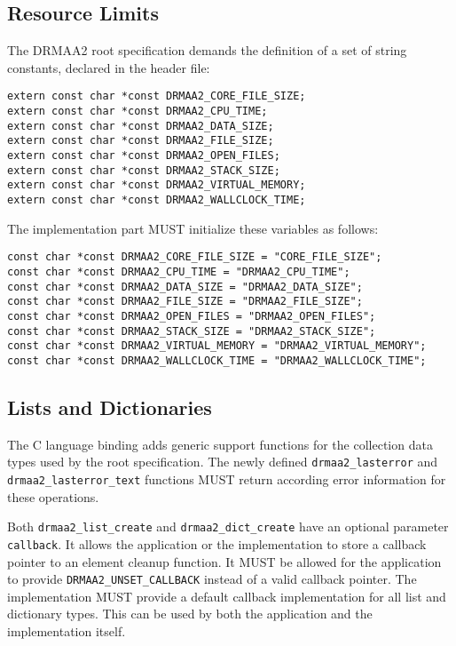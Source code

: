 \documentclass{article}
\newcommand{\h}[1]{\texttt{#1}}
\newcommand{\rat}[1]{}
\begin{document}
\subsection{Resource Limits}
\label{sec:resourcelimittype}

The DRMAA2 root specification demands the definition of a set of string constants, declared in the header file:

\begin{verbatim}
extern const char *const DRMAA2_CORE_FILE_SIZE;
extern const char *const DRMAA2_CPU_TIME;
extern const char *const DRMAA2_DATA_SIZE;
extern const char *const DRMAA2_FILE_SIZE;
extern const char *const DRMAA2_OPEN_FILES;
extern const char *const DRMAA2_STACK_SIZE;
extern const char *const DRMAA2_VIRTUAL_MEMORY;
extern const char *const DRMAA2_WALLCLOCK_TIME;
\end{verbatim}

The implementation part MUST initialize these variables as follows:

\begin{verbatim}
const char *const DRMAA2_CORE_FILE_SIZE = "CORE_FILE_SIZE";
const char *const DRMAA2_CPU_TIME = "DRMAA2_CPU_TIME";
const char *const DRMAA2_DATA_SIZE = "DRMAA2_DATA_SIZE";
const char *const DRMAA2_FILE_SIZE = "DRMAA2_FILE_SIZE";
const char *const DRMAA2_OPEN_FILES = "DRMAA2_OPEN_FILES";
const char *const DRMAA2_STACK_SIZE = "DRMAA2_STACK_SIZE";
const char *const DRMAA2_VIRTUAL_MEMORY = "DRMAA2_VIRTUAL_MEMORY";
const char *const DRMAA2_WALLCLOCK_TIME = "DRMAA2_WALLCLOCK_TIME";
\end{verbatim}

\subsection{Lists and Dictionaries}

The C language binding adds generic support functions for the collection data types used by the root specification. The newly defined \h{drmaa2\_lasterror} and \h{drmaa2\_lasterror\_text} functions MUST return according error information for these operations.

\rat{The definition of list operations in the language binding keeps the application code portable. The original DRMAA error codes are good enough to support them, there is no need for additional ones. DRMAA dictionaries are only used for strings, so we make the dictionary interface less general.}

Both \h{drmaa2\_list\_create} and \h{drmaa2\_dict\_create} have an optional parameter \h{callback}. It allows the application or the implementation to store a callback pointer to an element cleanup function. It MUST be allowed for the application to provide \h{DRMAA2\_UNSET\_CALLBACK} instead of a valid callback pointer. The implementation MUST provide a default callback implementation for all list and dictionary types. This can be used by both the application and the implementation itself.
\end{document}
